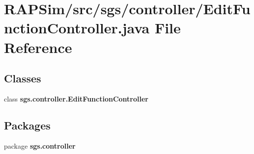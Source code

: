 \section{R\-A\-P\-Sim/src/sgs/controller/\-Edit\-Function\-Controller.java File Reference}
\label{_edit_function_controller_8java}
\subsection*{Classes}
\begin{DoxyCompactItemize}
\item 
class {\bf sgs.\-controller.\-Edit\-Function\-Controller}
\end{DoxyCompactItemize}
\subsection*{Packages}
\begin{DoxyCompactItemize}
\item 
package {\bf sgs.\-controller}
\end{DoxyCompactItemize}
